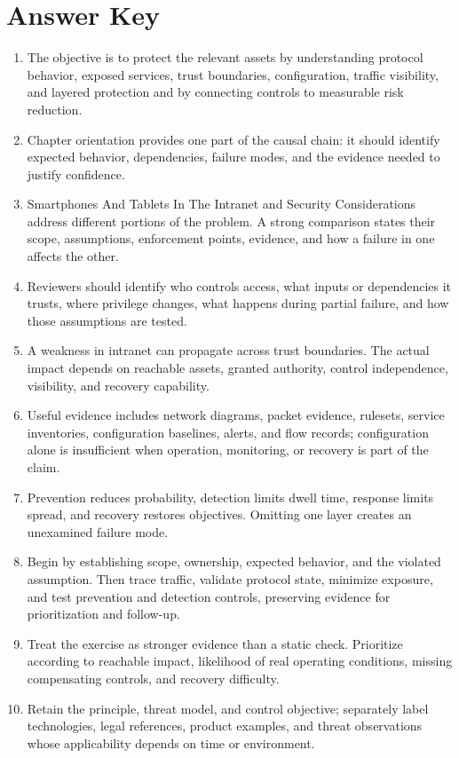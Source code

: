 \documentclass[11pt,letterpaper]{article}
\begin{document}
\section*{Answer Key}
\begin{enumerate}
\item The objective is to protect the relevant assets by understanding protocol behavior, exposed services, trust boundaries, configuration, traffic visibility, and layered protection and by connecting controls to measurable risk reduction.
\item Chapter orientation provides one part of the causal chain: it should identify expected behavior, dependencies, failure modes, and the evidence needed to justify confidence.
\item Smartphones And Tablets In The Intranet and Security Considerations address different portions of the problem. A strong comparison states their scope, assumptions, enforcement points, evidence, and how a failure in one affects the other.
\item Reviewers should identify who controls access, what inputs or dependencies it trusts, where privilege changes, what happens during partial failure, and how those assumptions are tested.
\item A weakness in intranet can propagate across trust boundaries. The actual impact depends on reachable assets, granted authority, control independence, visibility, and recovery capability.
\item Useful evidence includes network diagrams, packet evidence, rulesets, service inventories, configuration baselines, alerts, and flow records; configuration alone is insufficient when operation, monitoring, or recovery is part of the claim.
\item Prevention reduces probability, detection limits dwell time, response limits spread, and recovery restores objectives. Omitting one layer creates an unexamined failure mode.
\item Begin by establishing scope, ownership, expected behavior, and the violated assumption. Then trace traffic, validate protocol state, minimize exposure, and test prevention and detection controls, preserving evidence for prioritization and follow-up.
\item Treat the exercise as stronger evidence than a static check. Prioritize according to reachable impact, likelihood of real operating conditions, missing compensating controls, and recovery difficulty.
\item Retain the principle, threat model, and control objective; separately label technologies, legal references, product examples, and threat observations whose applicability depends on time or environment.
\end{enumerate}
\end{document}
